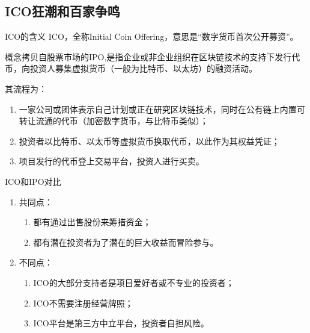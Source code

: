 \documentclass[11pt]{beamer}
\begin{document}
\subsection{ICO狂潮和百家争鸣}
\begin{frame}{ICO的含义}
	ICO，全称Initial Coin Offering，意思是“数字货币首次公开募资”。

	概念拷贝自股票市场的IPO,是指企业或非企业组织在区块链技术的支持下发行代币，向投资人募集虚拟货币（一般为比特币、以太坊）的融资活动。

	其流程为：
	\begin{enumerate}
		\item 一家公司或团体表示自己计划或正在研究区块链技术，同时在公有链上内置可转让流通的代币（加密数字货币，与比特币类似）；
		\item 投资者以比特币、以太币等虚拟货币换取代币，以此作为其权益凭证；
		\item 项目发行的代币登上交易平台，投资人进行买卖。
	\end{enumerate}
\end{frame}

\begin{frame}{ICO和IPO对比}
	\begin{enumerate}
		\item 共同点：
		      \begin{enumerate}
			      \item 都有通过出售股份来筹措资金；

			      \item 都有潜在投资者为了潜在的巨大收益而冒险参与。

		      \end{enumerate}

		\item 不同点：
		      \begin{enumerate}
			      \item 	ICO的大部分支持者是项目爱好者或不专业的投资者；

			      \item ICO不需要注册经营牌照；

			      \item 	ICO平台是第三方中立平台，投资者自担风险。
		      \end{enumerate}
	\end{enumerate}
\end{frame}
\end{document}
